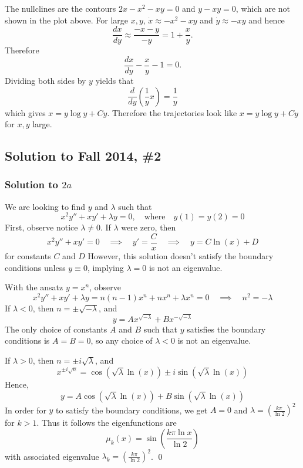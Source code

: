 The nullclines are the contours $2x-x^2-xy=0$ and $y-xy=0$, which are not shown in the plot above.
For large $x, y$, $\dot{x} \approx -x^{2} - xy$ and $\dot{y} \approx -xy$ and hence
$$\frac{dx}{dy} \approx \frac{-x - y}{-y} = 1 + \frac{x}{y}.$$
Therefore
$$\frac{dx}{dy} - \frac{x}{y} - 1 = 0.$$
Dividing both sides by $y$ yields that
$$\frac{d}{dy}\left(\frac{1}{y}x\right) = \frac{1}{y}$$
which gives $x = y\log y + Cy$. Therefore the trajectories look like
$x = y\log y + Cy$ for $x, y$ large.





\subsection*{Solution to Fall 2014, \#2}
\label{F14Q2}

\subsubsection*{Solution to $2a$}

We are looking to find $y$ and $\lambda$ such that
\[
x^2 y'' + x y' + \lambda y = 0, \quad \text{where} \quad y(1) = y(2) = 0
\]
First, observe notice $\lambda \neq 0$. If $\lambda$ were zero, then
\[
x^2 y'' + xy' = 0 \quad \implies \quad y' = \frac{C}{x} \quad \implies \quad y = C \ln(x) + D
\]
for constants $C$ and $D$ However, this solution doesn't satisfy the boundary conditions unless $y \equiv 0$, implying $\lambda = 0$ is not an eigenvalue.

With the ansatz $y = x^n$, observe
\[
x^2 y'' + x y' + \lambda y = n(n-1)x^n + n x^n + \lambda x^n = 0 \quad \implies \quad n^2 = - \lambda
\]
If $\lambda < 0$, then $n = \pm \sqrt{-\lambda}$, and
\[
y= A x^{\sqrt{-\lambda}} + Bx^{-\sqrt{-\lambda}}
\]
The only choice of constants $A$ and $B$ such that $y$ satisfies the boundary conditions is $A = B = 0$, so any choice of $\lambda < 0$ is not an eigenvalue. 						

If $\lambda > 0$, then $n = \pm i \sqrt{\lambda}$, and
\[
x^{\pm i \sqrt{n}} = \cos(\sqrt{\lambda} \ln(x)) \pm i \sin(\sqrt{\lambda} \ln (x))
\]
Hence,
\[
y = A \cos ( \sqrt{\lambda} \ln (x)) + B \sin( \sqrt{\lambda} \ln (x))
\]
In order for $y$ to satisfy the boundary conditions, we get $A=0$ and $\lambda = \left( \frac{k \pi}{\ln 2} \right)^2$ for $k > 1$. Thus it follows the eigenfunctions are
\[
\mu_k(x) = \sin \left( \frac{k \pi \ln x}{\ln 2} \right)
\]
with associated eigenvalue $\lambda_k =  \left( \frac{k \pi}{\ln 2} \right)^2$. \hfill \qed

